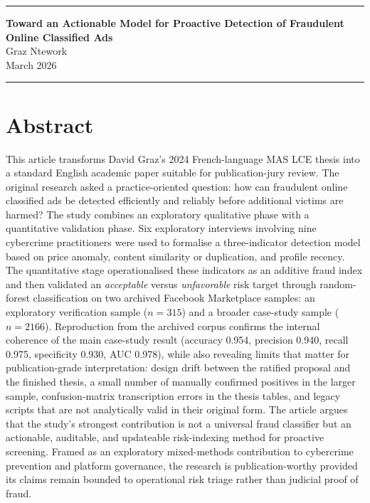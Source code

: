\documentclass[11pt,a4paper]{article}
\begin{document}
{\color{accent}\rule{\textwidth}{1.2pt}}
\begin{center}
    {\LARGE\bfseries Toward an Actionable Model for Proactive Detection of Fraudulent Online Classified Ads}\\[0.35em]
    {\large Graz Ntework}\\[0.8em]
    {\small March 2026}
\end{center}
{\color{accent}\rule{\textwidth}{0.65pt}}

\section*{Abstract}
This article transforms David Graz's 2024 French-language MAS LCE thesis into a standard English academic paper suitable for publication-jury review. The original research asked a practice-oriented question: how can fraudulent online classified ads be detected efficiently and reliably before additional victims are harmed? The study combines an exploratory qualitative phase with a quantitative validation phase. Six exploratory interviews involving nine cybercrime practitioners were used to formalise a three-indicator detection model based on price anomaly, content similarity or duplication, and profile recency. The quantitative stage operationalised these indicators as an additive fraud index and then validated an \emph{acceptable} versus \emph{unfavorable} risk target through random-forest classification on two archived Facebook Marketplace samples: an exploratory verification sample ($n=315$) and a broader case-study sample ($n=2166$). Reproduction from the archived corpus confirms the internal coherence of the main case-study result (accuracy 0.954, precision 0.940, recall 0.975, specificity 0.930, AUC 0.978), while also revealing limits that matter for publication-grade interpretation: design drift between the ratified proposal and the finished thesis, a small number of manually confirmed positives in the larger sample, confusion-matrix transcription errors in the thesis tables, and legacy scripts that are not analytically valid in their original form. The article argues that the study's strongest contribution is not a universal fraud classifier but an actionable, auditable, and updateable risk-indexing method for proactive screening. Framed as an exploratory mixed-methods contribution to cybercrime prevention and platform governance, the research is publication-worthy provided its claims remain bounded to operational risk triage rather than judicial proof of fraud.
\end{document}
